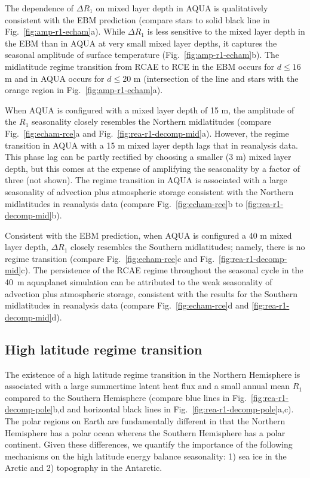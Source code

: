 \documentclass{ametsocV5}
\begin{document}
  The dependence of $\Delta R_1$ on mixed layer depth in AQUA is qualitatively consistent with the EBM prediction (compare stars to solid black line in Fig.~\ref{fig:amp-r1-echam}a). While $\Delta R_1$ is less sensitive to the mixed layer depth in the EBM than in AQUA at very small mixed layer depths, it captures the seasonal amplitude of surface temperature (Fig.~\ref{fig:amp-r1-echam}b). The midlatitude regime transition from RCAE to RCE in the EBM occurs for $d \le 16$ m and in AQUA occurs for $d \le 20$ m (intersection of the line and stars with the orange region in Fig.~\ref{fig:amp-r1-echam}a).

  When AQUA is configured with a mixed layer depth of 15 m, the amplitude of the \(R_{1}\) seasonality closely resembles the Northern midlatitudes (compare Fig.~\ref{fig:echam-rce}a and Fig.~\ref{fig:rea-r1-decomp-mid}a). However, the regime transition in AQUA with a 15 m mixed layer depth lags that in reanalysis data. This phase lag can be partly rectified by choosing a smaller (3 m) mixed layer depth, but this comes at the expense of amplifying the seasonality by a factor of three (not shown). The regime transition in AQUA is associated with a large seasonality of advection plus atmospheric storage consistent with the Northern midlatitudes in reanalysis data (compare Fig.~\ref{fig:echam-rce}b to \ref{fig:rea-r1-decomp-mid}b). 
  
  Consistent with the EBM prediction, when AQUA is configured a 40 m mixed layer depth, \(\Delta R_{1}\) closely resembles the Southern midlatitudes; namely, there is no regime transition (compare Fig.~\ref{fig:echam-rce}c and Fig.~\ref{fig:rea-r1-decomp-mid}c). The persistence of the RCAE regime throughout the seasonal cycle in the 40~m aquaplanet simulation can be attributed to the weak seasonality of advection plus atmospheric storage, consistent with the results for the Southern midlatitudes in reanalysis data (compare Fig.~\ref{fig:echam-rce}d and \ref{fig:rea-r1-decomp-mid}d).

  \subsection{High latitude regime transition} \label{subsec:ice}
  The existence of a high latitude regime transition in the Northern Hemisphere is associated with a large summertime latent heat flux and a small annual mean $R_1$ compared to the Southern Hemisphere (compare blue lines in Fig.~\ref{fig:rea-r1-decomp-pole}b,d and horizontal black lines in Fig.~\ref{fig:rea-r1-decomp-pole}a,c). The polar regions on Earth are fundamentally different in that the Northern Hemisphere has a polar ocean whereas the Southern Hemisphere has a polar continent. Given these differences, we quantify the importance of the following mechanisms on the high latitude energy balance seasonality: 1) sea ice in the Arctic and 2) topography in the Antarctic.
  
\end{document}
